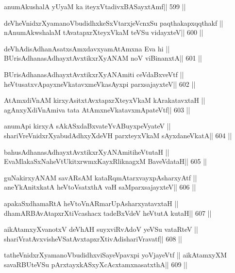 \begin{shl}
anumAkushalA yUyaM ka iteyxVtadivxBASayxtAmf\hfill || 599 ||
\end{shl}

\begin{shl}
deVheVnidxrXyamanoVbudidhxkeSxVtarxjeVcnxSu paqthakapxqqthakf ||
nAnumAkwshalaM tAvatapxrXteyxVkaM teVSu vidayxteV\hfill || 600 ||
\end{shl}

\begin{shl}
deVhAdisAdhanAsatxsAmxdavxyamAtAmxna Eva hi ||
BUrisAdhanasAdhayxtAvxtikxrXyANAM noV viBinanxtA\hfill || 601 ||
\end{shl}

\begin{shl}
BUrisAdhanasAdhayxtAvxtikxrXyANAmiti ceVdaBxveVtf ||
heVtusatxvApayxneVkatavxmeVkasAyxpi parxsajayxteV\hfill || 602 ||
\end{shl}

\begin{shl}
AtAmxdiVnAM kirxyAsitxtAvxtapxrXteyxVkaM kArakatavxtaH ||
agAnxyXdiVnAmiva tata AtAmxneVkatavxmApateVtf\hfill || 603 ||
\end{shl}

\begin{shl}
anumA\s pi kirxyA sAkASxdaBxvateYvABuyxpeVyateV ||
shariVreVnidxrXyabudAdhxyXdeVH parxteyxVkaM sAyxdaneVkatA\hfill || 604 ||
\end{shl}

\begin{shl}
bahusAdhanasAdhayxtAvxtikxrXyANAmitiheVtutaH ||
EvaMlakaSxNaheVtUkitxrwmxKayxRliknagxM BaveVdataH\hfill || 605 ||
\end{shl}

\begin{shl}
guNakirxyANAM savARsAM kataRqmAtarxvayxpAsharxyAtf ||
aneYkAnitxkatA heVtoVsatxthA vaH saMparxsajayxteV\hfill || 606 ||
\end{shl}

\begin{shl}
apakaSxdhamaRtA heVtoVnARmarUpAsharxyatavxtaH ||
dhamARBAvAtapxrXtiVcashacx tadeBxVdeV heVtutA kutaH\hfill || 607 ||
\end{shl}

\begin{shl}
aikAtamxyXvanotxV deVhAH suyxviRvAdoV yeVSu vataRteV ||
shariVratAvxvisheVSatAvxtapxrXtivAdishariVravatf\hfill || 608 ||
\end{shl}

\begin{shl}
tatheVnidxrXyamanoVbudidhxviSayeVpavxpi yoVjayeVtf ||
aikAtamxyXM savaRBUteVSu pArxtayxkASxyXcAcx\s\s tamxnasatxthA\hfill || 609 ||
\end{shl}

